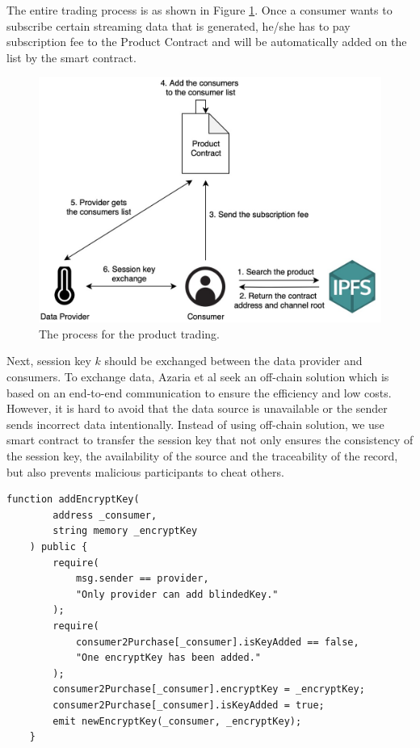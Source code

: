 \documentclass[journal,article,applsci,submit,moreauthors,pdftex]{Definitions/mdpi}
\begin{document}
The entire trading process is as shown in Figure \ref{fig:trading_product}. Once a consumer wants to subscribe certain streaming data that is generated, he/she has to pay subscription fee to the Product Contract and will be automatically added on the list by the smart contract.

\begin{figure}[H]
    \centering
    \includegraphics[width=3.3 in]{trading_product}
    \caption{The process for the product trading.}
    \label{fig:trading_product}
\end{figure}

Next, session key $k$ should be exchanged between the data provider and consumers. To exchange data, Azaria et al\cite{Medrec} seek an off-chain solution which is based on an end-to-end communication to ensure the efficiency and low costs. However, it is hard to avoid that the data source is unavailable or the sender sends incorrect data intentionally. Instead of using off-chain solution, we use smart contract to transfer the session key\cite{3tierDataMarket} that not only ensures the consistency of the session key, the availability of the source and the traceability of the record, but also prevents malicious participants to cheat others.

\lstset{style=solidity}

\begin{lstlisting}[caption={Update encrypt key}, label={lst:key_exchange}, frame=single]
    function addEncryptKey(
        address _consumer,
        string memory _encryptKey
    ) public {
        require(
            msg.sender == provider,
            "Only provider can add blindedKey."
        );
        require(
            consumer2Purchase[_consumer].isKeyAdded == false,
            "One encryptKey has been added."
        );
        consumer2Purchase[_consumer].encryptKey = _encryptKey;
        consumer2Purchase[_consumer].isKeyAdded = true;
        emit newEncryptKey(_consumer, _encryptKey);
    }
\end{lstlisting}
\end{document}
